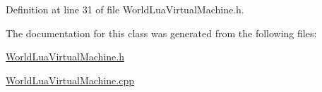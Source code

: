 Definition at line 31 of file World\+Lua\+Virtual\+Machine.\+h.



The documentation for this class was generated from the following files\+:\begin{DoxyCompactItemize}
\item 
\hyperlink{_world_lua_virtual_machine_8h}{World\+Lua\+Virtual\+Machine.\+h}\item 
\hyperlink{_world_lua_virtual_machine_8cpp}{World\+Lua\+Virtual\+Machine.\+cpp}\end{DoxyCompactItemize}
